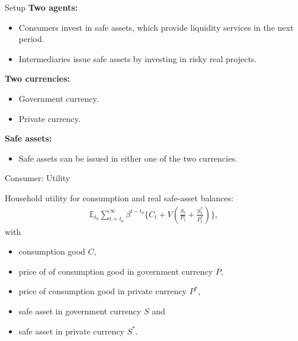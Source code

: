 \documentclass[11pt,aspectratio=169]{beamer}
\newcommand{\E}{\mathbb{E}}
\begin{document}
\begin{frame}{Setup}
\textbf{Two agents:}
    \begin{itemize}
    \item Consumers invest in safe assets, which provide liquidity services in the next period. 
    \item Intermediaries issue safe assets by investing in risky real projects. 
    \end{itemize}

\textbf{Two currencies:}
\begin{itemize}
    \item Government currency.
    \item Private currency.
\end{itemize}

\textbf{Safe assets:}
\begin{itemize}
\item Safe assets can be issued in either one of the two currencies. 
\end{itemize}
\end{frame}

\begin{frame}{Consumer: Utility}

Household utility for consumption and real safe-asset balances:
\begin{align}
\E_{t_0}\sum_{t=t_0}^\infty \beta^{t-t_0}\Big\{C_t + V\left(\frac{S_t}{P_t}+\frac{S_t^\ast}{P_t^\ast}\right)\Big\}, \label{4.14}
\end{align} with
\begin{itemize}
    \item consumption good $C$, 
    \item price of of consumption good in government currency $P$,
    \item price of consumption good in private currency $P^*$,
    \item safe asset in government currency $S$ and
    \item safe asset in private currency $S^*$.
\end{itemize}
\end{frame}
\end{document}

